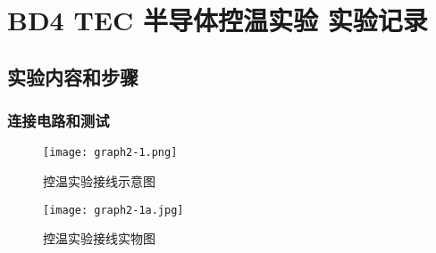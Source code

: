 \documentclass[dvipsnames, svgnames,a4paper,11pt]{article}
\begin{document}
\section{BD4 \quad TEC 半导体控温实验 \quad\heiti 实验记录}
\subsection{实验内容和步骤}

	\subsubsection{连接电路和测试}

        \begin{figure}[htbp]
            \centering
            \texttt{[image: graph2-1.png]}
            \caption{控温实验接线示意图}
            \label{fig:fig2-1}
        \end{figure}

        \begin{figure}[htbp]
            \centering
            \texttt{[image: graph2-1a.jpg]} %
            \caption{控温实验接线实物图}
            \label{fig:fig2-1a}
        \end{figure}
\end{document}
